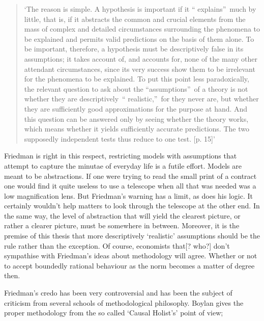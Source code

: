 \documentclass{ucthesis}
\begin{document}
\begin{quotation}
`The reason is simple. A hypothesis is important if it \textquotedblleft
explains\textquotedblright\ much by little, that is, if it abstracts the
common and crucial elements from the mass of complex and detailed
circumstances surrounding the phenomena to be explained and permits valid
predictions on the basis of them alone. To be important, therefore, a
hypothesis must be descriptively false in its assumptions; it takes account
of, and accounts for, none of the many other attendant circumstances, since
its very success show them to be irrelevant for the phenomena to be
explained. To put this point less paradoxically, the relevant question to
ask about the \textquotedblleft assumptions\textquotedblright\ of a theory
is not whether they are descriptively\ \textquotedblleft
realistic,\textquotedblright\ for they never are, but whether they are
sufficiently good approximations for the purpose at hand. And this question
can be answered only by seeing whether the theory works, which means whether
it yields sufficiently accurate predictions. The two supposedly independent
tests thus reduce to one test. [p. 15]' \cite[pp. 130-131]{boland 1983}
\end{quotation}

Friedman is right in this respect, restricting models with assumptions that
attempt to capture the minutae of everyday life is a futile effort. Models
are meant to be abstractions. If one were trying to read the small print of
a contract one would find it quite useless to use a telescope when all that
was needed was a low magnification lens. But Friedman's warning has a limit,
as does his logic. It certainly wouldn't help matters to look through the
telescope at the other end. In the same way, the level of abstraction that
will yield the clearest picture, or rather a clearer picture, must be
somewhere in between. Moreover, it is the premise of this thesis that more
descriptively `realistic' assumptions should be the rule rather than the
exception. Of course, economists that{\LARGE [? who?]} don't sympathise with
Friedman's ideas about methodology will agree. Whether or not to accept
boundedly rational behaviour as the norm becomes a matter of degree then.

Friedman's credo has been very controversial and has been the subject of
criticism from several schools of methodological philosophy. Boylan \cite[%
1995]{Boylan} gives the proper methodology from the so called `Causal
Holist's' point of view;
\end{document}

